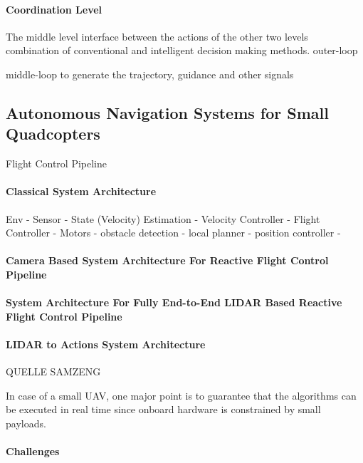 \paragraph{Coordination Level}

The  middle  level
interface between the actions of the other  two  levels  
combination  of  conventional  and   intelligent   decision   making   methods.   
outer-loop

middle-loop  to  generate  the  trajectory,  guidance  and  other  signals






\subsection{Autonomous Navigation Systems for Small Quadcopters}
Flight Control Pipeline


\paragraph{Classical System Architecture}
Env - Sensor - State (Velocity) Estimation                              - Velocity Controller - Flight Controller - Motors
             - obstacle detection - local planner - position controller -


\paragraph{Camera Based System Architecture For Reactive Flight Control Pipeline}

\paragraph{System Architecture For Fully End-to-End LIDAR Based Reactive Flight Control
Pipeline}


\paragraph{LIDAR to Actions System Architecture}

QUELLE SAMZENG

In case of a small UAV,
one major point is to
guarantee that the algorithms
can be executed in real time
since onboard hardware is constrained
by small payloads.



\paragraph{Challenges}





